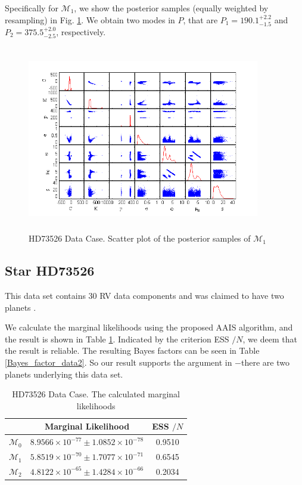 \documentclass[aoas]{imsart}
\def\ESS{\textsf{ESS }}
\begin{document}
Specifically for $\mathcal{M}_1$, we show the posterior samples
(equally weighted by resampling) in Fig. \ref{fig:scatter_1p_data1}.
 We obtain two modes in $P$, that are $P_1=190.1_{-1.5}^{+2.2}$ and
$P_2=375.5_{-2.5}^{+2.0}$, respectively.

\begin{figure}[!htb]
\centerline{\includegraphics[width=4in,height=3.2in]{Fig/scatter_1p_data1.png}}
\caption{HD73526 \cite{tinney2003four} Data Case. Scatter plot of
the posterior samples of
$\mathcal{M}_1$}\label{fig:scatter_1p_data1}
\end{figure}

\subsection{Star HD73526}
This data set contains 30 RV data components and was claimed to have
two planets \citep{tinney20062}.

We calculate the marginal likelihoods using the proposed AAIS
algorithm, and the result is shown in Table
\ref{marginal_likelihood_data2}. Indicated by the criterion
\ESS$/N$, we deem that the result is reliable. The resulting Bayes
factors can be seen in Table \ref{Bayes_factor_data2}. So our result
supports the argument in \cite{tinney20062}$-$there are two planets
underlying this data set.

\begin{table}
\begin{tabular}{c|c|c}
 & Marginal Likelihood & \ESS$/N$\\
\hline $\mathcal{M}_0$ & $8.9566\times10^{-77}\pm1.0852\times10^{-78}$ & 0.9510\\
\hline $\mathcal{M}_1$ & $5.8519\times10^{-70}\pm1.7077\times10^{-71}$ & 0.6545\\
\hline $\mathcal{M}_2$ & $4.8122\times10^{-65}\pm1.4284\times10^{-66}$ & 0.2034 \\
\hline
\end{tabular}
\caption{HD73526 \citep{tinney20062} Data Case. The calculated
marginal likelihoods}\label{marginal_likelihood_data2}
\end{table}
\end{document}
